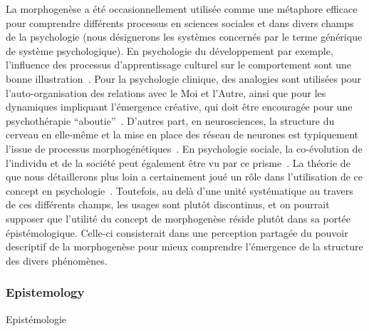 {}{
La morphogenèse a été occasionnellement utilisée comme une métaphore efficace pour comprendre différents processus en sciences sociales et dans divers champs de la psychologie (nous désignerons les systèmes concernés par le terme générique de système psychologique). En psychologie du développement par exemple, l'influence des processus d'apprentissage culturel sur le comportement sont une bonne illustration~\cite{hart_held_2013}. Pour la psychologie clinique, des analogies sont utilisées pour l'auto-organisation des relations avec le Moi et l'Autre, ainsi que pour les dynamiques impliquant l'émergence créative, qui doit être encouragée pour une psychothérapie ``aboutie''~\cite{piers_self-organizing_2007}. D'autres part, en neurosciences, la structure du cerveau en elle-même et la mise en place des réseau de neurones est typiquement l'issue de processus morphogénétiques~\cite{_issues_2013}. En psychologie sociale, la co-évolution de l'individu et de la société peut également être vu par ce prisme~\cite{archer_margaret_1999}. La théorie de  que nous détaillerons plus loin a certainement joué un rôle dans l'utilisation de ce concept en psychologie~\cite{de_luca_picione_processes_2016}. Toutefois, au delà d'une unité systématique au travers de ces différents champs, les usages sont plutôt discontinus, et on pourrait supposer que l'utilité du concept de morphogenèse réside plutôt dans sa portée épistémologique. Celle-ci consisterait dans une perception partagée du pouvoir descriptif de la morphogenèse pour mieux comprendre l'émergence de la structure des divers phénomènes.
}


\subsubsection{Epistemology}{Epistémologie}




